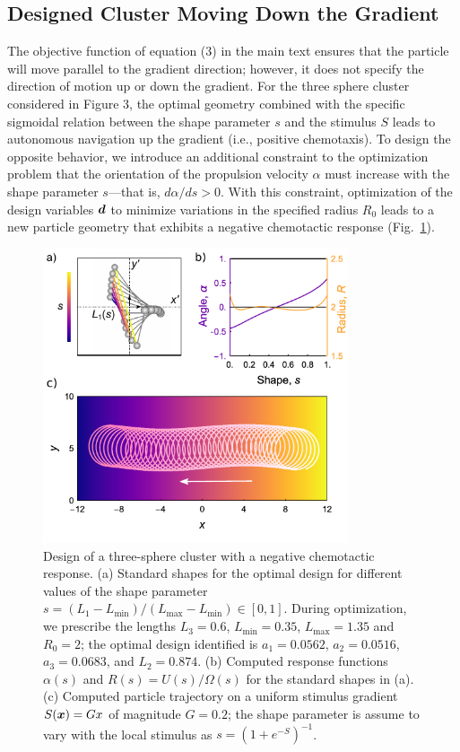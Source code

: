 \begin{appendices}
\section{Designed Cluster Moving Down the Gradient}

The objective function of equation (3) in the main text ensures that the particle will move parallel to the gradient direction; however, it does not specify the direction of motion up or down the gradient.  For the three sphere cluster considered in Figure 3, the optimal geometry combined with the specific sigmoidal relation between the shape parameter $s$ and the stimulus $S$ leads to autonomous navigation up the gradient (i.e., positive chemotaxis). To design the opposite behavior, we introduce an additional constraint to the optimization problem that the orientation of the propulsion velocity $\alpha$ must increase with the shape parameter $s$---that is, $d\alpha/ds>0$.  With this constraint, optimization of the design variables $\boldsymbol{d}$ to minimize variations in the specified radius $R_0$ leads to a new particle geometry that exhibits a negative chemotactic response (Fig.\ \ref{fig:negChemo}). 

\vspace{2cm}

\begin{figure}[h]
    \centering
    \includegraphics[width=9cm]{figures/A3_FigureS3.pdf}
    \caption{Design of a three-sphere cluster with a negative chemotactic response. (a) Standard shapes for the optimal design for different values of the shape parameter $s=(L_1-L_{\min})/(L_{\max}-L_{\min})\in [0,1]$. During optimization, we prescribe the lengths $L_3=0.6$, $L_{\min}=0.35$, $L_{\max}=1.35$ and $R_0=2$; the optimal design identified is $a_1=0.0562$, $a_2=0.0516$, $a_3=0.0683$, and $L_2=0.874$. (b) Computed response functions $\alpha(s)$ and $R(s)=U(s)/\Omega(s)$ for the standard shapes in (a). (c) Computed particle trajectory on a uniform stimulus gradient $S(\boldsymbol{x})=Gx$ of magnitude $G=0.2$; the shape parameter is assume to vary with the local stimulus as $s = (1+ e^{-S})^{-1}$.}
    \label{fig:negChemo}
\end{figure}


\end{appendices}
